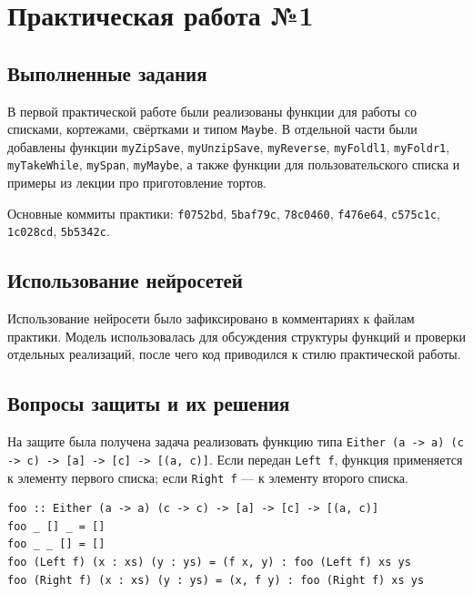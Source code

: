 \section{Практическая работа №1}
\label{sec:pr1}

\subsection{Выполненные задания}

В первой практической работе были реализованы функции для работы со списками, кортежами, свёртками и типом \texttt{Maybe}. В отдельной части были добавлены функции \texttt{myZipSave}, \texttt{myUnzipSave}, \texttt{myReverse}, \texttt{myFoldl1}, \texttt{myFoldr1}, \texttt{myTakeWhile}, \texttt{mySpan}, \texttt{myMaybe}, а также функции для пользовательского списка и примеры из лекции про приготовление тортов.

Основные коммиты практики: \texttt{f0752bd}, \texttt{5baf79c}, \texttt{78c0460}, \texttt{f476e64}, \texttt{c575c1c}, \texttt{1c028cd}, \texttt{5b5342c}.

\subsection{Использование нейросетей}

Использование нейросети было зафиксировано в комментариях к файлам практики. Модель использовалась для обсуждения структуры функций и проверки отдельных реализаций, после чего код приводился к стилю практической работы.

\subsection{Вопросы защиты и их решения}

На защите была получена задача реализовать функцию типа \texttt{Either (a -> a) (c -> c) -> [a] -> [c] -> [(a, c)]}. Если передан \texttt{Left f}, функция применяется к элементу первого списка; если \texttt{Right f} --- к элементу второго списка.

\label{lst:lab1-defense}
\begin{verbatim}
foo :: Either (a -> a) (c -> c) -> [a] -> [c] -> [(a, c)]
foo _ [] _ = []
foo _ _ [] = []
foo (Left f) (x : xs) (y : ys) = (f x, y) : foo (Left f) xs ys
foo (Right f) (x : xs) (y : ys) = (x, f y) : foo (Right f) xs ys
\end{verbatim}

\newpage
